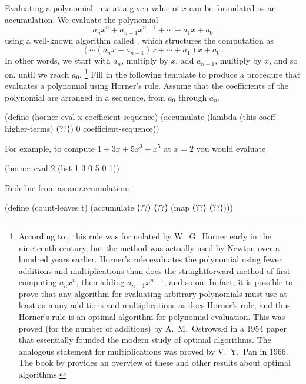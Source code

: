 \begin{exercise}
	\label{Exercise 2.34}
	Evaluating a polynomial in \( x \) at a given value of \( x \) can be formulated as an accumulation.
	We evaluate the polynomial
	\[
		a_n x^n + a_{n-1} x^{n-1} + \dotsb + a_1 x + a_0
	\]
	using a well-known algorithm called , which structures
	the computation as
	\[
		( \dotsm (a_n x + a_{n-1}) x + \dotsb + a_1) x + a_0 \,.
	\]
	In other words, we start with \( a_n \), multiply by \( x \), add
	\( a_{n-1} \), multiply by \( x \), and so on, until we reach
	\( a_0 \).%
	\footnote{
		According to , this rule was formulated by W.~G.~Horner early in the nineteenth century, but the method was actually used by Newton over a hundred years earlier.
		Horner’s rule evaluates the polynomial using fewer additions and multiplications than does the straightforward method of first computing \( a_n x^n \), then adding \( a_{n-1} x^{n-1} \), and so on.
		In fact, it is possible to prove that any algorithm for evaluating arbitrary polynomials must use at least as many additions and multiplications as does Horner’s rule, and thus Horner’s rule is an optimal algorithm for polynomial evaluation.
		This was proved (for the number of additions) by A.~M.~Ostrowski in a 1954 paper that essentially founded the modern study of optimal algorithms.
		The analogous statement for multiplications was proved by V.~Y.~Pan in 1966.
		The book by \autocite{barodin_munro_complexity_algebraic_numeric} provides an overview of these and other results about optimal algorithms.
	}
	Fill in the following template to produce a procedure that evaluates a polynomial using Horner’s rule.
	Assume that the coefficients of the polynomial are arranged in a sequence, from \( a_0 \) through \( a_n \).
	\begin{scheme}
	  (define (horner-eval x coefficient-sequence)
	    (accumulate (lambda (this-coeff higher-terms) ⟨??⟩)
	                0
	                coefficient-sequence))
	\end{scheme}
	For example, to compute \( 1 + 3x + 5x^3 + x^5 \) at \( x = 2 \) you would evaluate
	\begin{scheme}
	  (horner-eval 2 (list 1 3 0 5 0 1))
	\end{scheme}
\end{exercise}



\begin{exercise}
	\label{Exercise 2.35}
	Redefine  from  as an accumulation:
	\begin{scheme}
	  (define (count-leaves t)
	    (accumulate ⟨??⟩ ⟨??⟩ (map ⟨??⟩ ⟨??⟩)))
	\end{scheme}
\end{exercise}



